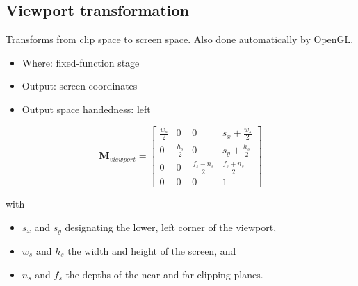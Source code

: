 \documentclass{scrartcl}
\begin{document}
    \subsection{Viewport transformation}

    Transforms from clip space to screen space. Also done automatically by OpenGL.

    \begin{itemize}
        \item Where: fixed-function stage
        \item Output: screen coordinates
         \item Output space handedness: left
    \end{itemize}

    \[
    \mathbf{M}_{viewport} =
    \begin{bmatrix}
        \frac{w_s}{2} & 0 & 0 & s_x + \frac{w_s}{2} \\
        0 & \frac{h_s}{2} & 0 & s_y + \frac{h_s}{2} \\
        0 & 0 & \frac{f_s - n_s}{2} & \frac{f_s + n_s}{2} \\
        0 & 0 & 0 & 1
    \end{bmatrix}
    \]

    with
    \begin{itemize}
        \item $s_x$ and $s_y$ designating the lower, left corner of the viewport,
        \item $w_s$ and $h_s$ the width and height of the screen, and
        \item $n_s$ and $f_s$ the depths of the near and far clipping planes.
    \end{itemize}
\end{document}
